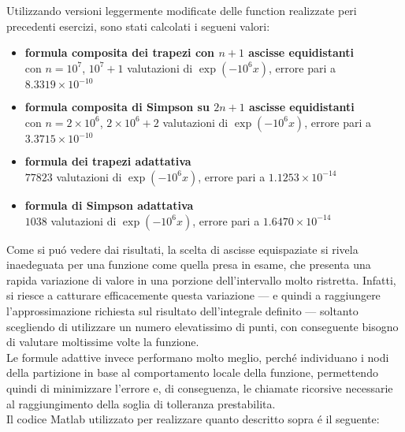 \begin{center}
\footnotesize\noindent{}
\end{center}

\noindent Utilizzando versioni leggermente modificate delle function realizzate peri precedenti esercizi, sono stati calcolati i segueni valori:

\begin{itemize}

  \item \textbf{formula composita dei trapezi con \(n+1\) ascisse equidistanti} \\ con \(n=10^7\), \(10^7 +1\) valutazioni di \(\exp(-10^6 x)\), errore pari a \(8.3319 \times 10^{-10}\)
  \item \textbf{formula composita di Simpson su \(2n+1\) ascisse equidistanti } \\ con \(n=2 \times 10^6\), \(2 \times 10^6 + 2\) valutazioni di \(\exp(-10^6 x)\), errore pari a \(3.3715 \times 10^{-10}\)
  \item \textbf{formula dei trapezi adattativa} \\ \(77823\) valutazioni di \(\exp(-10^6 x)\), errore pari a \(1.1253 \times 10^{-14}\)
  \item \textbf{formula di Simpson adattativa} \\ \(1038\) valutazioni di \(\exp(-10^6 x)\), errore pari a \(1.6470 \times 10^{-14}\)

\end{itemize}

\noindent Come si pu\'o vedere dai risultati, la scelta di ascisse equispaziate si rivela inaedeguata per una funzione come quella presa in esame, che presenta una rapida variazione di valore in una porzione dell'intervallo molto ristretta. Infatti, si riesce a catturare efficacemente questa variazione --- e quindi a raggiungere l'approssimazione richiesta sul risultato dell'integrale definito --- soltanto scegliendo di utilizzare un numero elevatissimo di punti, con conseguente bisogno di valutare moltissime volte la funzione.\\

\noindent Le formule adattive invece performano molto meglio, perch\'e individuano i nodi della partizione in base al comportamento locale della funzione, permettendo quindi di minimizzare l'errore e, di conseguenza, le chiamate ricorsive necessarie al raggiungimento della soglia di tolleranza prestabilita.\\

\noindent Il codice Matlab utilizzato per realizzare quanto descritto sopra \'e il seguente: \\



